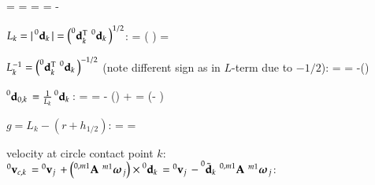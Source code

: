   \be
    \diffANCFt{\ANCFdkt} = 
    = 
  \ee
  \be
    \diffmIt{\ANCFdkt} = 
    = -
  \ee
  \item $L_k = |\prescript{0}{}{\mathbf{d}_k}\,| = \left(\prescript{0}{}{\mathbf{d}_k^\mathrm{T}}\, \prescript{0}{}{\mathbf{d}_k}\, \right) ^{1/2}$:
  \be
    \diffANCFmI{ |\ANCFdk| } = \left( \diffANCFdk \right) =
    \ANCFdkOtp \diffANCFdk 
  \ee
  \item $L_k^{-1} = \left(\prescript{0}{}{\mathbf{d}_k^\mathrm{T}}\, \prescript{0}{}{\mathbf{d}_k}\, \right) ^{-1/2}$ (note different sign as in $L$-term due to $-1/2$):
  \be
     =  = 
    -\left(\ANCFdkOtp \diffANCFdk \right)
  \ee
  \item $\prescript{0}{}{\mathbf{d}_{0,k}}\, = \frac{1}{L_k} \prescript{0}{}{\mathbf{d}_k}\,$: 
  \be
    \diffANCFmI{ \ANCFdkO } =  = 
    - \ANCFdk \otimes \left(\ANCFdkOtp \diffANCFdk \right) 
    +  \diffANCFdk =  \left(\Im - \ANCFdkO \otimes \ANCFdkO \right) \diffANCFdk
  \ee
  \item $g= L_k - (r + h_{1/2})$:
  \be
     =  =
    \ANCFdkOtp \diffANCFdk 
  \ee
  \item velocity at circle contact point $k$: $\prescript{0}{}{\mathbf{v}_{c,k}}\, = \prescript{0}{}{\mathbf{v}_j}\, + \left( \prescript{0,m1}{}{\mathbf{A}}\, \prescript{m1}{}{\mbox{\boldmath $\omega$ \unboldmath}\!\!}\,_{j} \right) \times \prescript{0}{}{\mathbf{d}_k}\, = \prescript{0}{}{\mathbf{v}_j}\, - \prescript{0}{}{\tilde {\mathbf{d}}_k}\, \prescript{0,m1}{}{\mathbf{A}}\, \prescript{m1}{}{\mbox{\boldmath $\omega$ \unboldmath}\!\!}\,_{j} $:
